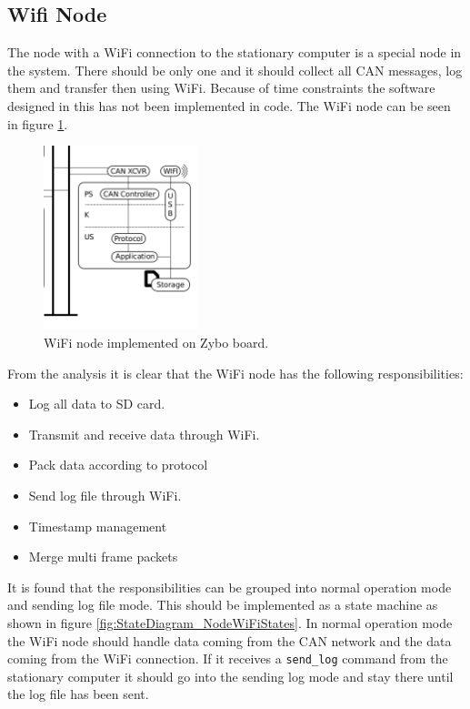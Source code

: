 \subsection{Wifi Node}
The node with a WiFi connection to the stationary computer is a special node in the system.
There should be only one and it should collect all CAN messages, log them and transfer then using WiFi.
Because of time constraints the software designed in this has not been implemented in code.
The WiFi node can be seen in figure \ref{fig:wifi_node}.

\begin{figure}[!h]
\centering
\includegraphics[width=0.4\textwidth]{graphics/wifi_node}
\caption{WiFi node implemented on Zybo board.}
\label{fig:wifi_node}
\end{figure}

From the analysis it is clear that the WiFi node has the following responsibilities:

\begin{itemize}
\item Log all data to SD card.
\item Transmit and receive data through WiFi.
\item Pack data according to protocol
\item Send log file through WiFi.
\item Timestamp management
\item Merge multi frame packets
\end{itemize}

It is found that the responsibilities can be grouped into normal operation mode and sending log file mode.
This should be implemented as a state machine as shown in figure \ref{fig:StateDiagram_NodeWiFiStates}.
In normal operation mode the WiFi node should handle data coming from the CAN network and the data coming from the WiFi connection.
If it receives a \texttt{send\_log} command from the stationary computer it should go into the sending log mode and stay there until the log file has been sent.

